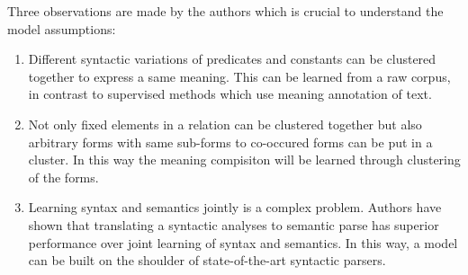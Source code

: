 \documentclass[12pt]{report}
\begin{document}
Three observations are made by the authors which is crucial to understand the model assumptions:

\begin{enumerate}
  \item Different syntactic variations of predicates and constants can be clustered together to express
   a same meaning. This can be learned from a raw corpus, in contrast to supervised methods which use meaning annotation of text.
   \item Not only fixed elements in a relation can be clustered together but also arbitrary forms with same sub-forms to co-occured forms 
   can be put in a cluster. In this way the meaning compisiton will be learned through clustering of the forms.
   \item Learning syntax and semantics jointly is a complex problem. Authors have shown that translating a syntactic analyses
   to semantic parse has superior performance over joint learning of syntax and semantics. In this way, a model can be built on the shoulder
   of state-of-the-art syntactic parsers.
   
\end{enumerate}
\end{document}
